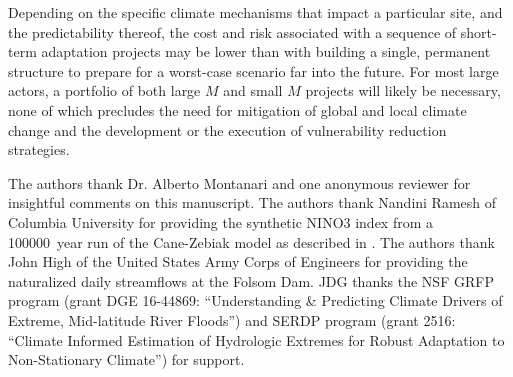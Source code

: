 \documentclass[
  draft,
  linenumbers
]{agujournal2019}
\begin{document}
Depending on the specific climate mechanisms that impact a particular site, and the predictability thereof, the cost and risk associated with a sequence of short-term adaptation projects may be lower than with building a single, permanent structure to prepare for a worst-case scenario far into the future.
For most large actors, a portfolio of both large $M$ and small $M$ projects will likely be necessary, none of which precludes the need for mitigation of global and local climate change and the development or the execution of vulnerability reduction strategies.


\acknowledgments

The authors thank Dr. Alberto Montanari and one anonymous reviewer for insightful comments on this manuscript.
The authors thank Nandini Ramesh of Columbia University for providing the synthetic NINO3 index from a \SI{100000}{year} run of the Cane-Zebiak model as described in \citet{Ramesh:2016hf}.
The authors thank John High of the United States Army Corps of Engineers for providing the naturalized daily streamflows at the Folsom Dam.
JDG thanks the NSF GRFP program (grant DGE 16-44869: ``Understanding \& Predicting Climate Drivers of Extreme, Mid-latitude River Floods'') and SERDP program (grant 2516: ``Climate Informed Estimation of Hydrologic Extremes for Robust Adaptation to Non-Stationary Climate'') for support.


\end{document}
